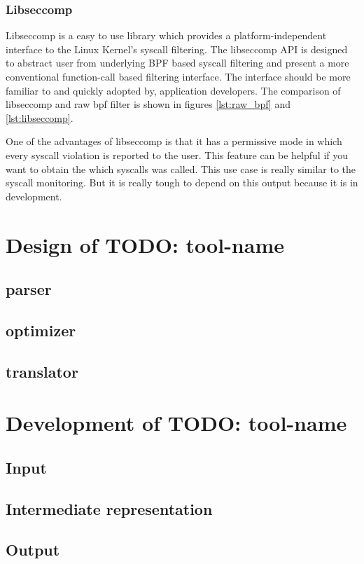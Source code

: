 \subsection{Libseccomp}
Libseccomp\cite{libseccomp_git} is a easy to use library which provides a platform-independent interface to the Linux Kernel's syscall filtering.
The libseccomp API is designed to abstract user from underlying BPF based syscall filtering and present a more conventional function-call based filtering interface.
The interface should be more familiar to and quickly adopted by, application developers.
The comparison of libseccomp and raw bpf filter is shown in figures \ref{lst:raw_bpf} and \ref{lst:libseccomp}.

One of the advantages of libseccomp is that it has a permissive mode in which every syscall violation is reported to the user.
This feature can be helpful if you want to obtain the which syscalls was called.
This use case is really similar to the syscall monitoring.
But it is really tough to depend on this output because it is in development.

\chapter{Design of TODO: tool-name}
\section{parser}
\section{optimizer}
\section{translator}



\chapter{Development of TODO: tool-name}
\section{Input}
\section{Intermediate representation}
\section{Output}
